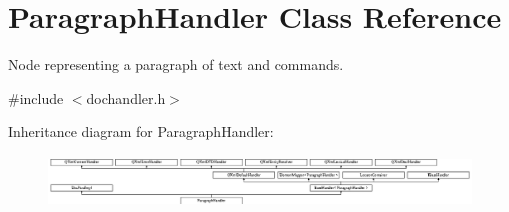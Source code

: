 \hypertarget{class_paragraph_handler}{}\section{Paragraph\+Handler Class Reference}
\label{class_paragraph_handler}


Node representing a paragraph of text and commands.  




{\ttfamily \#include $<$dochandler.\+h$>$}

Inheritance diagram for Paragraph\+Handler\+:\begin{figure}[H]
\begin{center}
\leavevmode
\includegraphics[height=1.350211cm]{class_paragraph_handler}
\end{center}
\end{figure}
